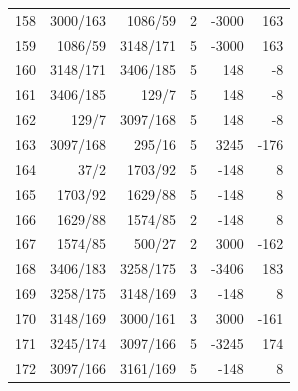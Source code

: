 \documentclass[11pt,a4paper]{article}
\begin{document}
\begin{minipage}[t]{.49\linewidth}
\begin{tabular*}{\linewidth}{@{}r@{\extracolsep{\fill}}rrrrr@{}}
158 & 3000/163 & 1086/59 & 2 & -3000 & 163\\
159 & 1086/59 & 3148/171 & 5 & -3000 & 163\\
160 & 3148/171 & 3406/185 & 5 & 148 & -8\\
161 & 3406/185 & 129/7 & 5 & 148 & -8\\
162 & 129/7 & 3097/168 & 5 & 148 & -8\\
163 & 3097/168 & 295/16 & 5 & 3245 & -176\\
164 & 37/2 & 1703/92 & 5 & -148 & 8\\
165 & 1703/92 & 1629/88 & 5 & -148 & 8\\
166 & 1629/88 & 1574/85 & 2 & -148 & 8\\
167 & 1574/85 & 500/27 & 2 & 3000 & -162\\
168 & 3406/183 & 3258/175 & 3 & -3406 & 183\\
169 & 3258/175 & 3148/169 & 3 & -148 & 8\\
170 & 3148/169 & 3000/161 & 3 & 3000 & -161\\
171 & 3245/174 & 3097/166 & 5 & -3245 & 174\\
172 & 3097/166 & 3161/169 & 5 & -148 & 8\\
\bottomrule\end{tabular*}\end{minipage}\par
\clearpage
{}\par\vspace{4pt}
\end{document}
